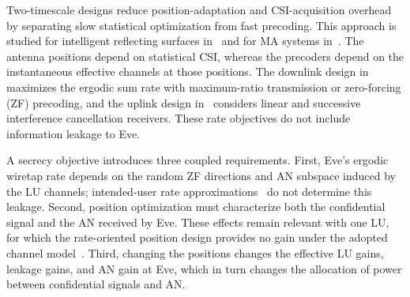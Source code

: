 \documentclass[journal]{IEEEtran}
\begin{document}
Two-timescale designs reduce position-adaptation and CSI-acquisition overhead by separating slow statistical optimization from fast precoding. This approach is studied for intelligent reflecting surfaces in~\cite{ZhaoTWC2021} and for MA systems in~\cite{ZhengTCOM2025,HuTVT2025}. The antenna positions depend on statistical CSI, whereas the precoders depend on the instantaneous effective channels at those positions. The downlink design in~\cite{ZhengTCOM2025} maximizes the ergodic sum rate with maximum-ratio transmission or zero-forcing (ZF) precoding, and the uplink design in~\cite{HuTVT2025} considers linear and successive interference cancellation receivers. These rate objectives do not include information leakage to Eve.

A secrecy objective introduces three coupled requirements. First, Eve's ergodic wiretap rate depends on the random ZF directions and AN subspace induced by the LU channels; intended-user rate approximations~\cite{ZhangJSTSP2014,ZhengTCOM2025,HuTVT2025} do not determine this leakage. Second, position optimization must characterize both the confidential signal and the AN received by Eve. These effects remain relevant with one LU, for which the rate-oriented position design provides no gain under the adopted channel model~\cite[Remark~2]{ZhengTCOM2025}. Third, changing the positions changes the effective LU gains, leakage gains, and AN gain at Eve, which in turn changes the allocation of power between confidential signals and AN.
\end{document}
